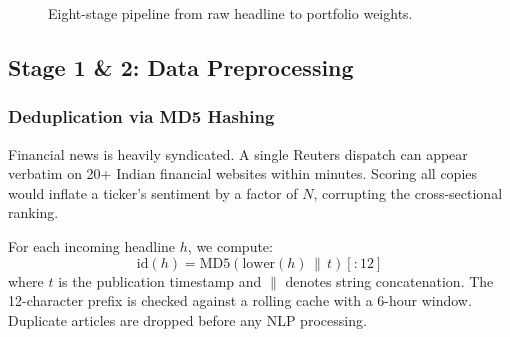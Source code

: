 \documentclass[12pt, a4paper]{article}
\begin{document}
\begin{figure}[H]
\centering
{}
\caption{Eight-stage pipeline from raw headline to portfolio weights.}
\end{figure}

\subsection{Stage 1 \& 2: Data Preprocessing}
\label{sec:preprocessing}

\subsubsection{Deduplication via MD5 Hashing}

Financial news is heavily syndicated. A single Reuters dispatch can appear verbatim on 20+ Indian financial websites within minutes. Scoring all copies would inflate a ticker's sentiment by a factor of $N$, corrupting the cross-sectional ranking.

For each incoming headline $h$, we compute:
\begin{equation}
    \text{id}(h) = \text{MD5}\!\left(\text{lower}(h) \,\|\, t\right)[:12]
\end{equation}
where $t$ is the publication timestamp and $\|$ denotes string concatenation. The 12-character prefix is checked against a rolling cache with a 6-hour window. Duplicate articles are dropped before any NLP processing.
\end{document}
